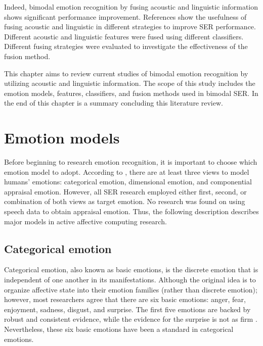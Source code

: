 Indeed, bimodal emotion recognition by fusing acoustic and linguistic
information shows significant performance improvement. References
\cite{Schuller2004,Schullera,Eyben2010,Ye2014,Tian2019} show the usefulness of
fusing acoustic and linguistic in different strategies to improve SER
performance. Different acoustic and linguistic features were fused using
different classifiers. Different fusing strategies were evaluated to
investigate the effectiveness of the fusion method.

This chapter aims to review current studies of bimodal emotion recognition by
utilizing acoustic and linguistic information. The scope of this study includes
the emotion models, features, classifiers, and fusion methods used in bimodal
SER. In the end of this chapter is a summary concluding this literature review.



\section{Emotion models}
Before beginning to research emotion recognition, it is important to choose
which emotion model to adopt. According to \cite{Grandjean2008}, there are at
least three views to model humans' emotions: categorical emotion, dimensional
emotion, and componential appraisal emotion. However, all SER research employed
either first, second, or combination of both views as target emotion.  No
research was found on using speech data to obtain appraisal emotion. Thus, the
following description describes major models in active affective computing
research. 

\subsection{Categorical emotion}
Categorical emotion, also known as basic emotions, is the discrete emotion that
is independent of one another in its manifestations. Although the original idea
is to organize affective state into their emotion families (rather than
discrete emotion); however, most researchers agree that there are six basic
emotions: anger, fear, enjoyment, sadness, disgust, and surprise. The first
five emotions are backed by robust and consistent evidence, while the evidence
for the surprise is not as firm \cite{Ekman1992}. Nevertheless, these six basic
emotions have been a standard in categorical emotions.

